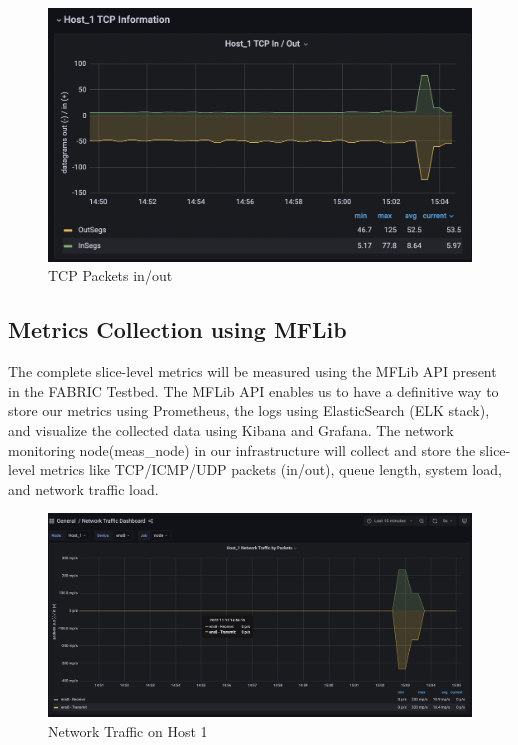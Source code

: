 \documentclass[conference]{IEEEtran}
\begin{document}
    \begin{figure}[h!]
        \includegraphics[scale=0.3]{Graph1.png}
        \centering
        \caption{TCP Packets in/out}
    \end{figure}

    \subsection{Metrics Collection using MFLib}
    The complete slice-level metrics will be measured using the MFLib API present in the FABRIC Testbed. The MFLib API enables us to have a definitive way to store our metrics using Prometheus, the logs using ElasticSearch (ELK stack), and visualize the collected data using Kibana and Grafana. The network monitoring node(meas\_node) in our infrastructure will collect and store the slice-level metrics like TCP/ICMP/UDP packets (in/out), queue length, system load, and network traffic load.

    \begin{figure}[h!]
        \includegraphics[scale=0.15]{Graph2.png}
        \centering
        \caption{Network Traffic on Host 1}
    \end{figure}
\end{document}
